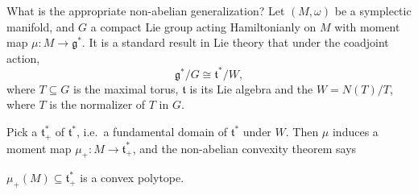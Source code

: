 \documentclass[a4paper]{article}
\begin{document}
What is the appropriate non-abelian generalization? Let $(M, \omega)$ be a symplectic manifold, and $G$ a compact Lie group acting Hamiltonianly on $M$ with moment map $\mu: M \to \mathfrak{g}^*$. It is a standard result in Lie theory that under the coadjoint action,
\[
  \mathfrak{g}^*/G \cong \mathfrak{t}^*/W,
\]
where $T \subseteq G$ is the maximal torus, $\mathfrak{t}$ is its Lie algebra and the  $W = N(T)/T$, where $T$ is the normalizer of $T$ in $G$.

Pick a  $\mathfrak{t}^*_+$ of $\mathfrak{t}^*$, i.e.\ a fundamental domain of $\mathfrak{t}^*$ under $W$. Then $\mu$ induces a moment map $\mu_+: M \to \mathfrak{t}^*_+$, and the non-abelian convexity theorem says
\begin{thm}[Kirwan, 1984]
  $\mu_+(M) \subseteq \mathfrak{t}^*_+$ is a convex polytope.
\end{thm}
\end{document}
